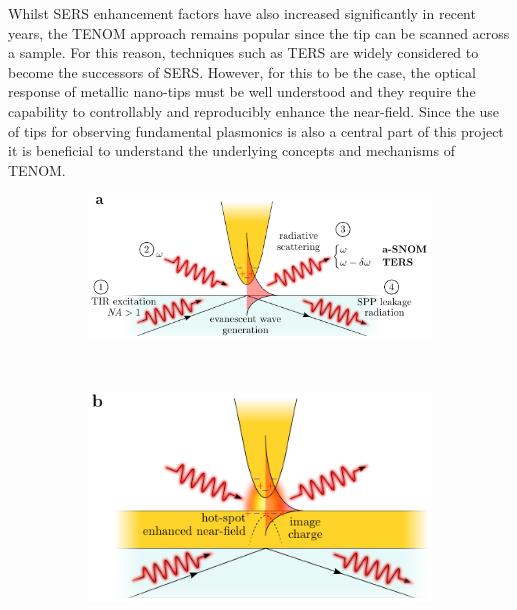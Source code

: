 \documentclass{article}
\begin{document}
Whilst SERS enhancement factors have also increased significantly in recent years, the TENOM approach remains popular since the tip can be scanned across a sample. For this reason, techniques such as TERS are widely considered to become the successors of SERS. However, for this to be the case, the optical response of metallic nano-tips must be well understood and they require the capability to controllably and reproducibly enhance the near-field. Since the use of tips for observing fundamental plasmonics is also a central part of this project it is beneficial to understand the underlying concepts and mechanisms of TENOM.

\begin{figure}[bt]
\begin{singlespace}
\centering
\begin{subfigure}[t]{0.49\textwidth}
	\includegraphics[scale=1.05]{figures/tenom_basic}
\end{subfigure}
~
\begin{subfigure}[t]{0.47\textwidth}
	\includegraphics[scale=1.05]{figures/tenom_surface}
\end{subfigure}
\end{singlespace}

\end{figure}
\end{document}
